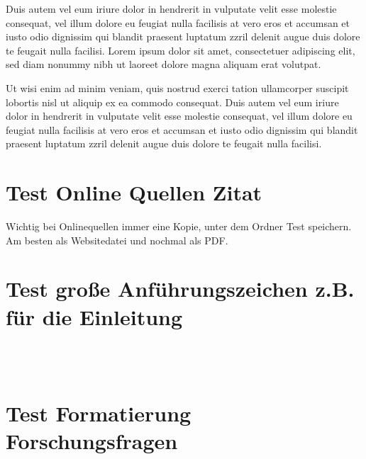 	Duis autem vel eum iriure dolor in hendrerit in vulputate velit esse molestie consequat, vel illum dolore eu feugiat nulla facilisis at vero eros et accumsan et iusto odio dignissim qui blandit praesent luptatum zzril delenit augue duis dolore te feugait nulla facilisi. Lorem ipsum dolor sit amet, consectetuer adipiscing elit, sed diam nonummy nibh  ut laoreet dolore magna aliquam erat volutpat.
	
	Ut wisi enim ad minim veniam, quis nostrud exerci tation ullamcorper suscipit lobortis nisl ut aliquip ex ea commodo consequat. Duis autem vel eum iriure dolor in hendrerit in vulputate velit esse molestie consequat, vel illum dolore eu feugiat nulla facilisis at vero eros et accumsan et iusto odio dignissim qui blandit praesent luptatum zzril delenit augue duis dolore te feugait nulla facilisi.
	
	\section{Test Online Quellen Zitat}
	Wichtig bei Onlinequellen immer eine Kopie, unter dem Ordner Test  speichern. Am besten als Websitedatei und nochmal als PDF.\cite{qs.koeln}
	
	
	\section{Test große Anführungszeichen z.B. für die Einleitung}
	\begin{fancyquotes}
		\vspace{0.5cm} \\
		\label{sec:einleitungsbeispiel}\lipsum[50]\\
		\vspace{0.5cm}
	\end{fancyquotes}
	
	
	\section{Test Formatierung Forschungsfragen}
	
	
	
